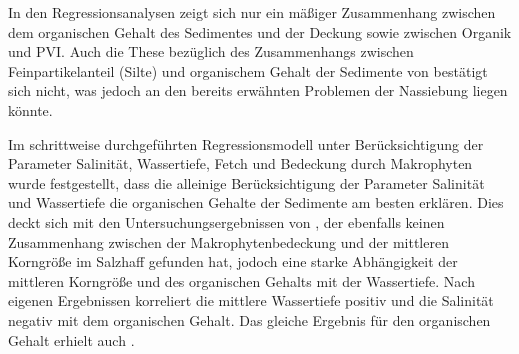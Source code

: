 In den Regressionsanalysen zeigt sich nur ein mäßiger Zusammenhang zwischen dem organischen Gehalt des Sedimentes und der Deckung sowie zwischen Organik und PVI. Auch die These bezüglich des Zusammenhangs zwischen Feinpartikelanteil (Silte) und organischem Gehalt der Sedimente  von \cite{steinhardt_2001} bestätigt sich nicht, was jedoch an den bereits erwähnten Problemen der Nassiebung liegen könnte. 

Im schrittweise durchgeführten Regressionsmodell unter Berücksichtigung der Parameter Salinität, Wassertiefe, Fetch und Bedeckung durch Makrophyten wurde festgestellt, dass die alleinige Berücksichtigung der Parameter Salinität und Wassertiefe die organischen Gehalte der Sedimente am besten erklären. Dies deckt sich mit den Untersuchungsergebnissen von \cite{steinhardt_2001}, der ebenfalls keinen Zusammenhang zwischen der Makrophytenbedeckung und der mittleren Korngröße im Salzhaff gefunden hat, jodoch eine starke Abhängigkeit der mittleren Korngröße und des organischen Gehalts mit der Wassertiefe. Nach eigenen Ergebnissen korreliert die mittlere Wassertiefe positiv und die Salinität negativ mit dem organischen Gehalt. Das gleiche Ergebnis für den organischen Gehalt erhielt auch  \cite{steinhardt_2001}.



